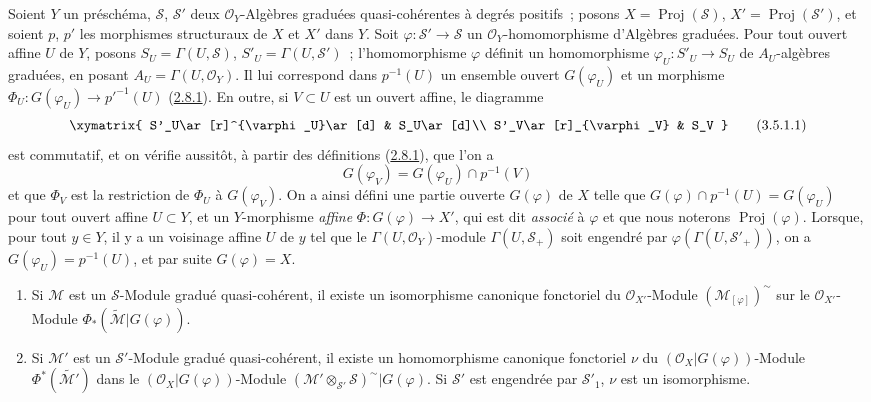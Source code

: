 \begin{env}[3.5.1]
\label{II.3.5.1-fr}
Soient $Y$ un préschéma, $\mathcal{S}$, $\mathcal{S}'$ deux
$\mathcal{O}_Y$-Algèbres graduées quasi-cohérentes à degrés positifs~; posons
$X=\operatorname{Proj}(\mathcal{S})$, $X'=\operatorname{Proj}(\mathcal{S}')$,
et soient $p$, $p'$ les morphismes structuraux de $X$ et $X'$ dans $Y$. Soit
$\varphi:\mathcal{S}'\to\mathcal{S}$ un $\mathcal{O}_Y$-homomorphisme
d'Algèbres graduées. Pour tout ouvert affine $U$ de $Y$, posons
$S_U=\Gamma(U,\mathcal{S})$, $S'_U=\Gamma(U,\mathcal{S}')$~;
l'homomorphisme $\varphi$ définit un homomorphisme
$\varphi_U:S'_U\to S_U$ de $A_U$-algèbres graduées, en posant
$A_U=\Gamma(U,\mathcal{O}_Y)$. Il lui correspond dans $p^{-1}(U)$ un ensemble
ouvert $G(\varphi_U)$ et un morphisme
$\Phi_U:G(\varphi_U)\to p'^{-1}(U)$
(\hyperref[II.2.8.1-fr]{2.8.1}). En outre, si $V\subset U$ est un ouvert
affine, le diagramme
\[
\label{II.3.5.1.1-fr}
  \xymatrix{
    S'_U\ar[r]^{\varphi_U}\ar[d]
    & S_U\ar[d]\\
    S'_V\ar[r]_{\varphi_V}
    & S_V
  }
\tag{3.5.1.1}
\]
est commutatif, et on vérifie aussitôt, à partir des définitions
(\hyperref[II.2.8.1-fr]{2.8.1}), que l'on a
\[
  G(\varphi_V)=G(\varphi_U)\cap p^{-1}(V)
\]
et que $\Phi_V$ est la restriction de $\Phi_U$ à $G(\varphi_V)$. On a ainsi
défini une partie ouverte $G(\varphi)$ de $X$ telle que
$G(\varphi)\cap p^{-1}(U)=G(\varphi_U)$ pour tout ouvert affine $U\subset Y$,
et un $Y$-morphisme
\emph{affine} $\Phi:G(\varphi)\to X'$, qui est dit \emph{associé} à $\varphi$ et que
nous noterons $\operatorname{Proj}(\varphi)$. Lorsque, pour tout $y\in Y$, il
y a un voisinage affine $U$ de $y$ tel que le
$\Gamma(U,\mathcal{O}_Y)$-module $\Gamma(U,\mathcal{S}_+)$ soit engendré par
$\varphi(\Gamma(U,\mathcal{S}'_+))$, on a
$G(\varphi_U)=p^{-1}(U)$, et par suite $G(\varphi)=X$.
\end{env}

\begin{proposition}[3.5.2]
\label{II.3.5.2-fr}
\begin{enumerate}
  \item[\rm(i)] Si $\mathcal{M}$ est un $\mathcal{S}$-Module gradué
    quasi-cohérent, il existe un isomorphisme canonique fonctoriel du
    $\mathcal{O}_{X'}$-Module $(\mathcal{M}_{[\varphi]})^{\sim}$ sur le
    $\mathcal{O}_{X'}$-Module
    $\Phi_*(\widetilde{\mathcal{M}}|G(\varphi))$.
  \item[\rm(ii)] Si $\mathcal{M}'$ est un $\mathcal{S}'$-Module gradué
    quasi-cohérent, il existe un homomorphisme canonique fonctoriel $\nu$ du
    $(\mathcal{O}_X|G(\varphi))$-Module
    $\Phi^*(\widetilde{\mathcal{M}'})$ dans le
    $(\mathcal{O}_X|G(\varphi))$-Module
    $(\mathcal{M}'\otimes_{\mathcal{S}'}\mathcal{S})^{\sim}|G(\varphi)$. Si
    $\mathcal{S}'$ est engendrée par $\mathcal{S}'_1$, $\nu$ est un
    isomorphisme.
\end{enumerate}
\end{proposition}

